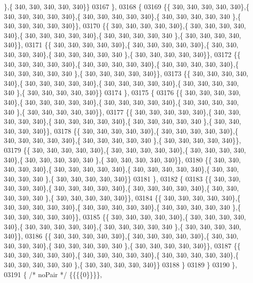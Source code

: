\begin{DoxyCode}
      \},\{ 340, 340, 340, 340, 340\}\}
03167 \},
03168 \{
03169 \{\{ 340, 340, 340, 340, 340\},\{ 340, 340, 340, 340, 340\},\{ 340, 340, 340, 340, 340\},\{ 340, 340, 340, 340, 340
      \},\{ 340, 340, 340, 340, 340\}\},
03170 \{\{ 340, 340, 340, 340, 340\},\{ 340, 340, 340, 340, 340\},\{ 340, 340, 340, 340, 340\},\{ 340, 340, 340, 340, 340
      \},\{ 340, 340, 340, 340, 340\}\},
03171 \{\{ 340, 340, 340, 340, 340\},\{ 340, 340, 340, 340, 340\},\{ 340, 340, 340, 340, 340\},\{ 340, 340, 340, 340, 340
      \},\{ 340, 340, 340, 340, 340\}\},
03172 \{\{ 340, 340, 340, 340, 340\},\{ 340, 340, 340, 340, 340\},\{ 340, 340, 340, 340, 340\},\{ 340, 340, 340, 340, 340
      \},\{ 340, 340, 340, 340, 340\}\},
03173 \{\{ 340, 340, 340, 340, 340\},\{ 340, 340, 340, 340, 340\},\{ 340, 340, 340, 340, 340\},\{ 340, 340, 340, 340, 340
      \},\{ 340, 340, 340, 340, 340\}\}
03174 \},
03175 \{
03176 \{\{ 340, 340, 340, 340, 340\},\{ 340, 340, 340, 340, 340\},\{ 340, 340, 340, 340, 340\},\{ 340, 340, 340, 340, 340
      \},\{ 340, 340, 340, 340, 340\}\},
03177 \{\{ 340, 340, 340, 340, 340\},\{ 340, 340, 340, 340, 340\},\{ 340, 340, 340, 340, 340\},\{ 340, 340, 340, 340, 340
      \},\{ 340, 340, 340, 340, 340\}\},
03178 \{\{ 340, 340, 340, 340, 340\},\{ 340, 340, 340, 340, 340\},\{ 340, 340, 340, 340, 340\},\{ 340, 340, 340, 340, 340
      \},\{ 340, 340, 340, 340, 340\}\},
03179 \{\{ 340, 340, 340, 340, 340\},\{ 340, 340, 340, 340, 340\},\{ 340, 340, 340, 340, 340\},\{ 340, 340, 340, 340, 340
      \},\{ 340, 340, 340, 340, 340\}\},
03180 \{\{ 340, 340, 340, 340, 340\},\{ 340, 340, 340, 340, 340\},\{ 340, 340, 340, 340, 340\},\{ 340, 340, 340, 340, 340
      \},\{ 340, 340, 340, 340, 340\}\}
03181 \},
03182 \{
03183 \{\{ 340, 340, 340, 340, 340\},\{ 340, 340, 340, 340, 340\},\{ 340, 340, 340, 340, 340\},\{ 340, 340, 340, 340, 340
      \},\{ 340, 340, 340, 340, 340\}\},
03184 \{\{ 340, 340, 340, 340, 340\},\{ 340, 340, 340, 340, 340\},\{ 340, 340, 340, 340, 340\},\{ 340, 340, 340, 340, 340
      \},\{ 340, 340, 340, 340, 340\}\},
03185 \{\{ 340, 340, 340, 340, 340\},\{ 340, 340, 340, 340, 340\},\{ 340, 340, 340, 340, 340\},\{ 340, 340, 340, 340, 340
      \},\{ 340, 340, 340, 340, 340\}\},
03186 \{\{ 340, 340, 340, 340, 340\},\{ 340, 340, 340, 340, 340\},\{ 340, 340, 340, 340, 340\},\{ 340, 340, 340, 340, 340
      \},\{ 340, 340, 340, 340, 340\}\},
03187 \{\{ 340, 340, 340, 340, 340\},\{ 340, 340, 340, 340, 340\},\{ 340, 340, 340, 340, 340\},\{ 340, 340, 340, 340, 340
      \},\{ 340, 340, 340, 340, 340\}\}
03188 \}
03189 \}
03190 \},
03191 \{ \textcolor{comment}{/* noPair */} \{\{\{\{0\}\}\}\},

\end{DoxyCode}
